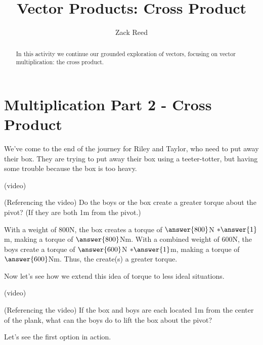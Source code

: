 \documentclass{ximera}
\title{Vector Products: Cross Product}
\author{Zack Reed}
\begin{document}
\begin{abstract}
In this activity we continue our grounded exploration of vectors, focusing on vector multiplication: the cross product.
\end{abstract}
\maketitle

\section{Multiplication Part 2 - Cross Product}

We've come to the end of the journey for Riley and Taylor, who need to put away their box. They are trying to put away their box using a teeter-totter, but having some trouble because the box is too heavy. 

(video)

\begin{problem}
    (Referencing the video) Do the boys or the box create a greater torque about the pivot? (If they are both 1m from the pivot.)

    With a weight of $800$N, the box creates a torque of $\answer{800}$N $*\answer{1}$m, making a torque of $\answer{800}$Nm. With a combined weight of $600$N, the boys create a torque of $\answer{600}$N $*\answer{1}$m, making a torque of $\answer{600}$Nm. Thus, the  create(s) a greater torque.
\end{problem}

Now let's see how we extend this idea of torque to less ideal situations.

(video)

\begin{problem}
    (Referencing the video) If the box and boys are each located 1m from the center of the plank, what can the boys do to lift the box about the pivot?

    \begin{selectAll}
    \end{selectAll}
\end{problem}

Let's see the first option in action.
\end{document}
